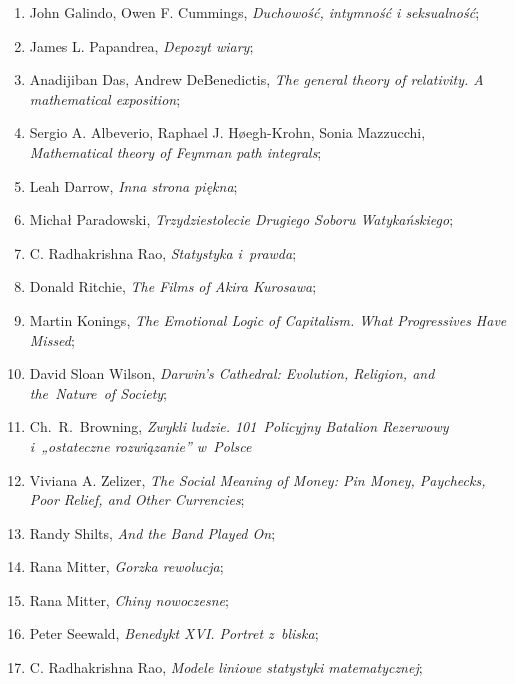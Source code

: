 \documentclass[a4paper,11pt]{article}
\begin{document}
\begin{enumerate}
\item John Galindo, Owen F. Cummings, \textit{Duchowość, intymność i
    seksualność};

\item James L. Papandrea, \textit{Depozyt wiary};

\item Anadijiban Das, Andrew DeBenedictis, \textit{The general theory of
    relativity. A mathematical exposition};

\item Sergio A. Albeverio, Raphael J. H\o egh-Krohn, Sonia Mazzucchi,
  \textit{Mathematical theory of Feynman path integrals};

\item Leah Darrow, \textit{Inna strona piękna};

\item Michał Paradowski, \textit{Trzydziestolecie Drugiego Soboru
    Watykańskiego};

\item C. Radhakrishna Rao, \textit{Statystyka i~prawda};

\item Donald Ritchie, \textit{The Films of Akira Kurosawa};

\item Martin Konings, \textit{The Emotional Logic of Capitalism. What
    Progressives Have Missed};

\item David Sloan Wilson, \textit{Darwin's Cathedral: Evolution,
    Religion, and the~Nature~of Society};

\item Ch.~R.~Browning, \textit{Zwykli ludzie. 101~Policyjny Batalion
    Rezerwowy i~„ostateczne rozwiązanie” w~Polsce}

\item Viviana A. Zelizer, \textit{The Social Meaning of Money: Pin
    Money, Paychecks, Poor Relief, and Other Currencies};

\item Randy Shilts, \textit{And the Band Played On};

\item Rana Mitter, \textit{Gorzka rewolucja};

\item Rana Mitter, \textit{Chiny nowoczesne};

\item Peter Seewald, \textit{Benedykt XVI. Portret z~bliska};

\item C. Radhakrishna Rao, \textit{Modele liniowe statystyki matematycznej};


\end{enumerate}
\end{document}
